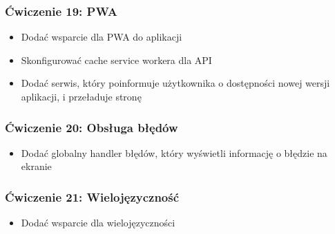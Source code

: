 \documentclass{beamer}
\begin{document}
\begin{frame}
    \frametitle{Ćwiczenie 19: PWA}
    \begin{itemize}
        \item Dodać wsparcie dla PWA do aplikacji
        \item Skonfigurować cache service workera dla API
        \item Dodać serwis, który poinformuje użytkownika o dostępności nowej wersji aplikacji, i przeładuje stronę
    \end{itemize}
\end{frame}

\begin{frame}
    \frametitle{Ćwiczenie 20: Obsługa błędów}
    \begin{itemize}
        \item Dodać globalny handler błędów, który wyświetli informację o błędzie na ekranie
    \end{itemize}
\end{frame}

\begin{frame}
    \frametitle{Ćwiczenie 21: Wielojęzyczność}
    \begin{itemize}
        \item Dodać wsparcie dla wielojęzyczności
    \end{itemize}
\end{frame}
\end{document}

